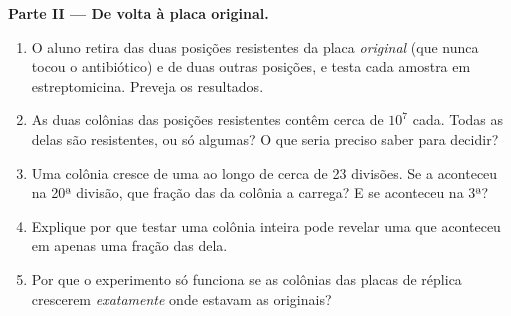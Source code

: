 \begin{problem}
\medskip
\noindent\textbf{Parte II --- De volta à placa original.}
\begin{enumerate}[resume]
  \item O aluno retira  das duas posições resistentes da placa
        \emph{original} (que nunca tocou o antibiótico) e de duas
        outras posições, e testa cada amostra em estreptomicina.
        Preveja os resultados.
  \item As duas colônias das posições resistentes contêm cerca de
        $10^7$  cada. Todas as  delas são resistentes,
        ou só algumas? O que seria preciso saber para decidir?
  \item Uma colônia cresce de uma  ao longo de cerca de 23
        divisões. Se a  aconteceu na 20ª divisão, que fração
        das  da colônia a carrega? E se aconteceu na 3ª?
  \item Explique por que testar uma colônia inteira pode revelar uma
         que aconteceu em apenas uma fração das  dela.
  \item Por que o experimento só funciona se as colônias das placas de
        réplica crescerem \emph{exatamente} onde estavam as originais?
\end{enumerate}


\end{problem}
